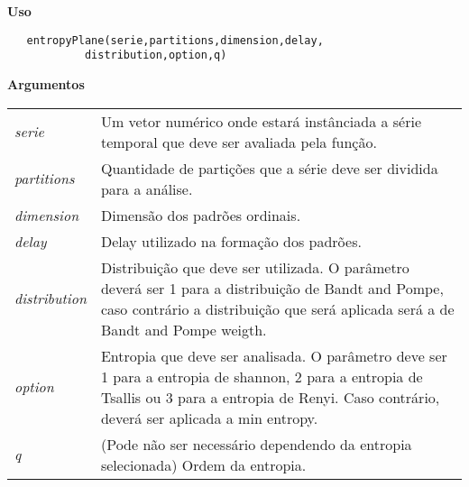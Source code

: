 \vspace{-0.5cm}

\hrulefill  

\vspace{0.5cm}

\textbf{Uso}

\begin{lstlisting}
   entropyPlane(serie,partitions,dimension,delay,
   			distribution,option,q)
\end{lstlisting}

\vspace{0.5cm}

\textbf{Argumentos}

\begin{table}[!ht]
\begin{center}
\begin{tabularx}{\textwidth}{X X}
\hspace{0.5cm} \textit{serie} \vspace{0.5cm}& Um vetor numérico onde estará instânciada a série temporal que deve ser avaliada pela função.\vspace{0.5cm}\\
\hspace{0.5cm} \textit{partitions} \vspace{0.5cm}& Quantidade de partições que a série deve ser dividida para a análise.\vspace{0.5cm}\\
\hspace{0.5cm} \textit{dimension} \vspace{0.5cm}& Dimensão dos padrões ordinais.\vspace{0.5cm}\\
\hspace{0.5cm} \textit{delay} \vspace{0.5cm}& Delay utilizado na formação dos padrões.\vspace{0.5cm}\\
\hspace{0.5cm} \textit{distribution} \vspace{0.5cm}& Distribuição que deve ser utilizada. O parâmetro deverá ser 1 para a distribuição de Bandt and Pompe, caso contrário a distribuição que será aplicada será a de Bandt and Pompe weigth.\vspace{0.5cm}\\
\hspace{0.5cm} \textit{option} \vspace{0.5cm}& Entropia que deve ser analisada. O parâmetro deve ser 1 para a entropia de shannon, 2 para a entropia de Tsallis ou 3 para a entropia de Renyi. Caso contrário, deverá ser aplicada a min entropy.\vspace{0.5cm}\\
\hspace{0.5cm} \textit{q} \vspace{0.5cm}& (Pode não ser necessário dependendo da entropia selecionada) Ordem da entropia.\vspace{0.5cm}\\
\end{tabularx}
\end{center}
\end{table} 

